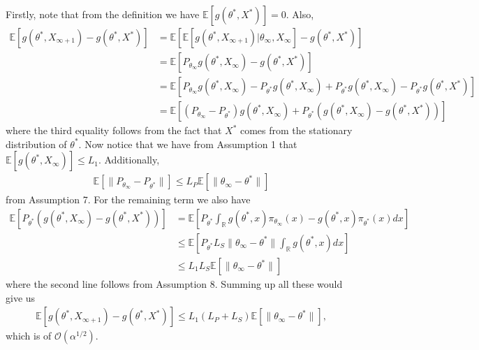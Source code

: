 \documentclass[a4paper]{article}
\newcommand{\norm}[1]{\|#1 \|}
\newcommand{\Exs}{\mathbb{E}}
\newcommand{\thetastar}{\theta^*}
\newcommand{\thetainf}{\theta_\infty}
\newcommand{\xstar}{X^*}
\newcommand{\xinf}{X_{\infty}}
\newcommand{\xinfPone}{X_{\infty + 1}}
\newcommand{\stepsize}{\alpha}
\begin{document}
	 Firstly, note that from the definition we have $\Exs\left[g\left(\thetastar, X^{*}\right)\right] = 0$. Also, 
	 \begin{align*}
	 	\Exs\left[g\left(\thetastar, \xinfPone\right) - g\left(\thetastar, \xstar\right)\right] &= \Exs\left[\Exs\left[g\left(\thetastar, \xinfPone\right) | \thetainf, \xinf\right] - g\left(\thetastar, \xstar\right)\right]\\
	 	&= \Exs\left[P_{\thetainf}g\left(\thetastar, \xinf\right) - g\left(\thetastar, \xstar\right)\right]\\
	 	&= \Exs\left[P_{\thetainf}g\left(\thetastar, \xinf\right) - P_{\thetastar}g\left(\thetastar, \xinf\right) + P_{\thetastar}g\left(\thetastar, \xinf\right) - P_{\thetastar}g\left(\thetastar, \xstar\right)\right]\\
	 	&= \Exs\left[\left(P_{\thetainf} - P_{\thetastar}\right)g\left(\thetastar, \xinf\right) + P_{\thetastar}\left(g\left(\thetastar, \xinf\right) - g\left(\thetastar, \xstar\right)\right)\right]
	 \end{align*}
	 where the third equality follows from the fact that $\xstar$ comes from the stationary distribution of $\thetastar$. Now notice that we have from Assumption 1 that $\Exs\left[g\left(\thetastar, \xinf\right)\right] \leq L_{1}$. Additionally,
	 \begin{align*}
	 	\Exs\left[\norm{P_{\thetainf} - P_{\thetastar}}\right] \leq L_{P}\Exs\left[\norm{\thetainf - \thetastar}\right]
	 \end{align*}
	 from Assumption 7. For the remaining term we also have
	 \begin{align*}
	 	\Exs\left[P_{\thetastar}\left(g\left(\thetastar, \xinf\right) - g\left(\thetastar, \xstar\right)\right)\right] &= \Exs\left[P_{\thetastar}\int_{\mathbb{R}}g\left(\thetastar, x\right)\pi_{\thetainf}(x) - g\left(\thetastar, x\right)\pi_{\thetastar}(x) dx\right]\\
	 	& \leq \Exs\left[P_{\thetastar}L_{S}\norm{\thetainf - \thetastar}\int_{\mathbb{R}}g\left(\thetastar, x\right)dx\right]\\
	 	& \leq L_{1}L_{S}\Exs\left[\norm{\thetainf - \thetastar}\right]
	 \end{align*}
	 where the second line follows from Assumption 8. Summing up all these would give us
	 \begin{align*}
	 	\Exs\left[g\left(\thetastar, \xinfPone\right) - g\left(\thetastar, \xstar\right)\right] \leq L_{1}\left(L_{P} + L_{S}\right)\Exs\left[\norm{\thetainf - \thetastar}\right],
	 \end{align*}
	 which is of $\mathcal{O}(\stepsize^{1 / 2})$.
	 
\end{document}
